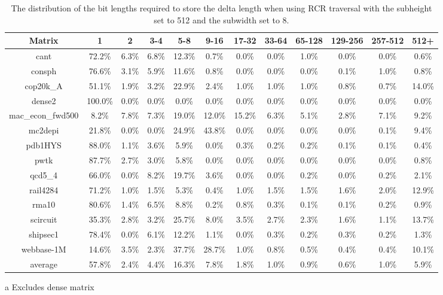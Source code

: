 \begin{sidewaystable}
\centering
\begin{threeparttable}
    \caption[The distribution of deltas by bit length.]{The distribution of the bit lengths required to store the delta length when using RCR traversal with the subheight set to 512 and the subwidth set to 8.}
\label{tbl:indexDist}
\begin{tabular}{cccccccccccc}
\hline
\bfseries Matrix & \bfseries 1 & \bfseries 2 & \bfseries 3-4 & \bfseries 5-8 & \bfseries 9-16 & \bfseries 17-32 & \bfseries 33-64 &\bfseries 65-128 & \bfseries 129-256 & \bfseries 257-512 & \bfseries 512+\\
\hline
cant & 72.2\% & 6.3\% & 6.8\% & 12.3\% & 0.7\% & 0.0\% & 0.0\% & 1.0\% & 0.0\% & 0.0\% & 0.6\% \\
consph & 76.6\% & 3.1\% & 5.9\% & 11.6\% & 0.8\% & 0.0\% & 0.0\% & 0.0\% & 0.1\% & 1.0\% & 0.8\% \\
cop20k\_A & 51.1\% & 1.9\% & 3.2\% & 22.9\% & 2.4\% & 1.0\% & 1.0\% & 1.0\% & 0.8\% & 0.7\% & 14.0\% \\
dense2 & 100.0\% & 0.0\% & 0.0\% & 0.0\% & 0.0\% & 0.0\% & 0.0\% & 0.0\% & 0.0\% & 0.0\% & 0.0\% \\
mac\_econ\_fwd500 & 8.2\% & 7.8\% & 7.3\% & 19.0\% & 12.0\% & 15.2\% & 6.3\% & 5.1\% & 2.8\% & 7.1\% & 9.2\% \\
mc2depi & 21.8\% & 0.0\% & 0.0\% & 24.9\% & 43.8\% & 0.0\% & 0.0\% & 0.0\% & 0.0\% & 0.1\% & 9.4\% \\
pdb1HYS & 88.0\% & 1.1\% & 3.6\% & 5.9\% & 0.0\% & 0.3\% & 0.2\% & 0.2\% & 0.1\% & 0.1\% & 0.4\% \\
pwtk & 87.7\% & 2.7\% & 3.0\% & 5.8\% & 0.0\% & 0.0\% & 0.0\% & 0.0\% & 0.0\% & 0.0\% & 0.8\% \\
qcd5\_4 & 66.0\% & 0.0\% & 8.2\% & 19.7\% & 3.6\% & 0.0\% & 0.0\% & 0.2\% & 0.0\% & 0.2\% & 2.1\% \\
rail4284 & 71.2\% & 1.0\% & 1.5\% & 5.3\% & 0.4\% & 1.0\% & 1.5\% & 1.5\% & 1.6\% & 2.0\% & 12.9\% \\
rma10 & 80.6\% & 1.4\% & 6.5\% & 8.8\% & 0.2\% & 0.8\% & 0.3\% & 0.1\% & 0.1\% & 0.2\% & 0.9\% \\
scircuit & 35.3\% & 2.8\% & 3.2\% & 25.7\% & 8.0\% & 3.5\% & 2.7\% & 2.3\% & 1.6\% & 1.1\% & 13.7\% \\
shipsec1 & 78.4\% & 0.0\% & 6.1\% & 12.2\% & 1.1\% & 0.0\% & 0.3\% & 0.2\% & 0.3\% & 0.2\% & 1.3\% \\
webbase-1M & 14.6\% & 3.5\% & 2.3\% & 37.7\% & 28.7\% & 1.0\% & 0.8\% & 0.5\% & 0.4\% & 0.4\% & 10.1\% \\
\hline
average\tnote{a} & 57.8\% & 2.4\% & 4.4\% & 16.3\% & 7.8\% & 1.8\% & 1.0\% & 0.9\% & 0.6\% & 1.0\% & 5.9\% \\
\hline
\end{tabular}
\begin{tablenotes}
\item [a] Excludes dense matrix
\end{tablenotes}
\end{threeparttable}
\end{sidewaystable}%

